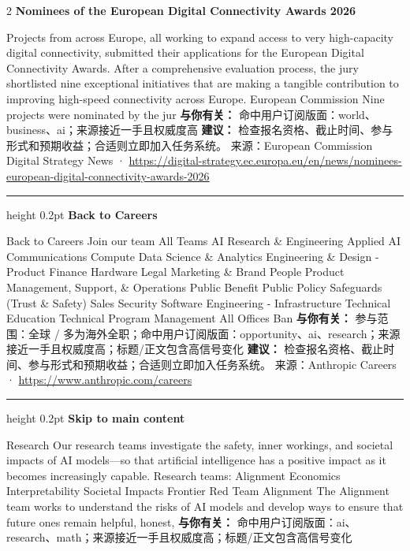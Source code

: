 \documentclass[10.5pt]{ctexart}
\begin{document}
\begin{multicols}{2}
{\large\bfseries Nominees of the European Digital Connectivity Awards 2026}\par
Projects from across Europe, all working to expand access to very high-capacity digital connectivity, submitted their applications for the European Digital Connectivity Awards. After a comprehensive evaluation process, the jury shortlisted nine exceptional initiatives that are making a tangible contribution to improving high-speed connectivity across Europe. European Commission Nine projects were nominated by the jur
\textbf{与你有关：} 命中用户订阅版面：world、business、ai；来源接近一手且权威度高
\textbf{建议：} 检查报名资格、截止时间、参与形式和预期收益；合适则立即加入任务系统。
{\footnotesize\color{ormuted} 来源：European Commission Digital Strategy News · \url{https://digital-strategy.ec.europa.eu/en/news/nominees-european-digital-connectivity-awards-2026}}
\vspace{2mm}
\hrule height 0.2pt
\vspace{2mm}
{\large\bfseries Back to Careers}\par
Back to Careers Join our team All Teams AI Research \& Engineering Applied AI Communications Compute Data Science \& Analytics Engineering \& Design - Product Finance Hardware Legal Marketing \& Brand People Product Management, Support, \& Operations Public Benefit Public Policy Safeguards (Trust \& Safety) Sales Security Software Engineering - Infrastructure Technical Education Technical Program Management All Offices Ban
\textbf{与你有关：} 参与范围：全球 / 多为海外全职；命中用户订阅版面：opportunity、ai、research；来源接近一手且权威度高；标题/正文包含高信号变化
\textbf{建议：} 检查报名资格、截止时间、参与形式和预期收益；合适则立即加入任务系统。
{\footnotesize\color{ormuted} 来源：Anthropic Careers · \url{https://www.anthropic.com/careers}}
\vspace{2mm}
\hrule height 0.2pt
\vspace{2mm}
{\large\bfseries Skip to main content}\par
Research Our research teams investigate the safety, inner workings, and societal impacts of AI models—so that artificial intelligence has a positive impact as it becomes increasingly capable. Research teams: Alignment Economics Interpretability Societal Impacts Frontier Red Team Alignment The Alignment team works to understand the risks of AI models and develop ways to ensure that future ones remain helpful, honest, 
\textbf{与你有关：} 命中用户订阅版面：ai、research、math；来源接近一手且权威度高；标题/正文包含高信号变化

\end{multicols}
\end{document}
